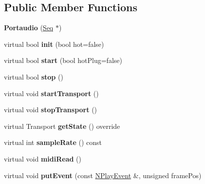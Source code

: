 \subsection*{Public Member Functions}
\begin{DoxyCompactItemize}
\item 
\mbox{\label{class_ms_1_1_portaudio_a5483b2c92f22c295eeab9ee438b655d4}} 
{\bfseries Portaudio} (\hyperlink{class_ms_1_1_seq}{Seq} $\ast$)
\item 
\mbox{\label{class_ms_1_1_portaudio_a771a19a13cf6846f2c459da5a3ff2354}} 
virtual bool {\bfseries init} (bool hot=false)
\item 
\mbox{\label{class_ms_1_1_portaudio_a360d4eba543ecb55210231376049beb0}} 
virtual bool {\bfseries start} (bool hot\+Plug=false)
\item 
\mbox{\label{class_ms_1_1_portaudio_af2c54030e070ec83de30da8bc664d236}} 
virtual bool {\bfseries stop} ()
\item 
\mbox{\label{class_ms_1_1_portaudio_a209de30408390001e151d560661f131d}} 
virtual void {\bfseries start\+Transport} ()
\item 
\mbox{\label{class_ms_1_1_portaudio_a4444ad2f152482eb30d858aefc14fb0f}} 
virtual void {\bfseries stop\+Transport} ()
\item 
\mbox{\label{class_ms_1_1_portaudio_a1338d70539fb4e7d3837b575982f0612}} 
virtual Transport {\bfseries get\+State} () override
\item 
\mbox{\label{class_ms_1_1_portaudio_a7bf339d4741cbff88f108fe30eabeefb}} 
virtual int {\bfseries sample\+Rate} () const
\item 
\mbox{\label{class_ms_1_1_portaudio_a03fdfaae703ac5c3268f8737ebb44ac8}} 
virtual void {\bfseries midi\+Read} ()
\item 
\mbox{\label{class_ms_1_1_portaudio_ab0b3afc83ea94e5f8230f9a055f7cf33}} 
virtual void {\bfseries put\+Event} (const \hyperlink{class_ms_1_1_n_play_event}{N\+Play\+Event} \&, unsigned frame\+Pos)

\end{DoxyCompactItemize}

